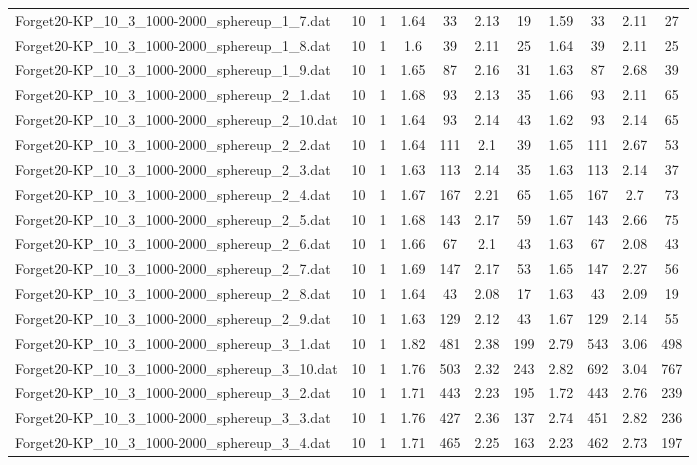 \begin{table}[!ht]
\begin{tabular}{lcccccccccc}
Forget20-KP\_10\_3\_1000-2000\_sphereup\_1\_7.dat & 10 & 1 & 1.64 & 33 & 2.13 & 19 & 1.59 & 33 & 2.11 & 27 \\
Forget20-KP\_10\_3\_1000-2000\_sphereup\_1\_8.dat & 10 & 1 & 1.6 & 39 & 2.11 & 25 & 1.64 & 39 & 2.11 & 25 \\
Forget20-KP\_10\_3\_1000-2000\_sphereup\_1\_9.dat & 10 & 1 & 1.65 & 87 & 2.16 & 31 & 1.63 & 87 & 2.68 & 39 \\
Forget20-KP\_10\_3\_1000-2000\_sphereup\_2\_1.dat & 10 & 1 & 1.68 & 93 & 2.13 & 35 & 1.66 & 93 & 2.11 & 65 \\
Forget20-KP\_10\_3\_1000-2000\_sphereup\_2\_10.dat & 10 & 1 & 1.64 & 93 & 2.14 & 43 & 1.62 & 93 & 2.14 & 65 \\
Forget20-KP\_10\_3\_1000-2000\_sphereup\_2\_2.dat & 10 & 1 & 1.64 & 111 & 2.1 & 39 & 1.65 & 111 & 2.67 & 53 \\
Forget20-KP\_10\_3\_1000-2000\_sphereup\_2\_3.dat & 10 & 1 & 1.63 & 113 & 2.14 & 35 & 1.63 & 113 & 2.14 & 37 \\
Forget20-KP\_10\_3\_1000-2000\_sphereup\_2\_4.dat & 10 & 1 & 1.67 & 167 & 2.21 & 65 & 1.65 & 167 & 2.7 & 73 \\
Forget20-KP\_10\_3\_1000-2000\_sphereup\_2\_5.dat & 10 & 1 & 1.68 & 143 & 2.17 & 59 & 1.67 & 143 & 2.66 & 75 \\
Forget20-KP\_10\_3\_1000-2000\_sphereup\_2\_6.dat & 10 & 1 & 1.66 & 67 & 2.1 & 43 & 1.63 & 67 & 2.08 & 43 \\
Forget20-KP\_10\_3\_1000-2000\_sphereup\_2\_7.dat & 10 & 1 & 1.69 & 147 & 2.17 & 53 & 1.65 & 147 & 2.27 & 56 \\
Forget20-KP\_10\_3\_1000-2000\_sphereup\_2\_8.dat & 10 & 1 & 1.64 & 43 & 2.08 & 17 & 1.63 & 43 & 2.09 & 19 \\
Forget20-KP\_10\_3\_1000-2000\_sphereup\_2\_9.dat & 10 & 1 & 1.63 & 129 & 2.12 & 43 & 1.67 & 129 & 2.14 & 55 \\
Forget20-KP\_10\_3\_1000-2000\_sphereup\_3\_1.dat & 10 & 1 & 1.82 & 481 & 2.38 & 199 & 2.79 & 543 & 3.06 & 498 \\
Forget20-KP\_10\_3\_1000-2000\_sphereup\_3\_10.dat & 10 & 1 & 1.76 & 503 & 2.32 & 243 & 2.82 & 692 & 3.04 & 767 \\
Forget20-KP\_10\_3\_1000-2000\_sphereup\_3\_2.dat & 10 & 1 & 1.71 & 443 & 2.23 & 195 & 1.72 & 443 & 2.76 & 239 \\
Forget20-KP\_10\_3\_1000-2000\_sphereup\_3\_3.dat & 10 & 1 & 1.76 & 427 & 2.36 & 137 & 2.74 & 451 & 2.82 & 236 \\
Forget20-KP\_10\_3\_1000-2000\_sphereup\_3\_4.dat & 10 & 1 & 1.71 & 465 & 2.25 & 163 & 2.23 & 462 & 2.73 & 197 \\

\end{tabular}
\end{table}
